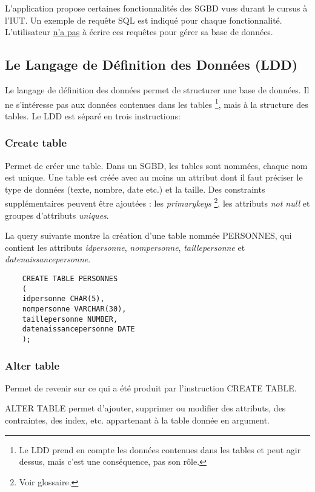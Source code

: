 L'application propose certaines fonctionnalités des SGBD vues durant le cursus à l'IUT.
Un exemple de requête SQL est indiqué pour chaque fonctionnalité.
L'utilisateur \underline{n'a pas} à écrire ces requêtes pour gérer sa base de données.

\subsection{Le Langage de Définition des Données (LDD)}
Le langage de définition des données permet de structurer une base de données.
Il ne s'intéresse pas aux données contenues dans les tables
\footnote{\label{interet_ldd}Le LDD prend en compte les données contenues dans les tables et peut agir dessus, mais c'est une conséquence, pas son rôle.}, mais à la structure des tables. Le LDD est séparé en trois instructions:

\subsubsection{Create table}
Permet de créer une \gls{table}. Dans un SGBD, les tables sont nommées, chaque nom est unique.
Une table est créée avec au moins un attribut dont il faut préciser le type de données (texte, nombre, date etc.) et la taille.
Des \glspl{constraint} supplémentaires peuvent être ajoutées : les \textit{\glspl{primarykey}} \footnote{\label{contrainte_clée_primaire}Voir glossaire.}, les attributs \textit{not null} et groupes d'attributs \textit{uniques}.

La \gls{query} suivante montre la création d'une table nommée PERSONNES, qui contient les attributs \textit{idpersonne}, \textit{nompersonne}, \textit{taillepersonne} et \textit{datenaissancepersonne}.

  \begin{lstlisting}
    CREATE TABLE PERSONNES
    (
    idpersonne CHAR(5),
    nompersonne VARCHAR(30),
    taillepersonne NUMBER,
    datenaissancepersonne DATE
    );
  \end{lstlisting}

\subsubsection{Alter table}
Permet de revenir sur ce qui a été produit par l'instruction CREATE TABLE.

ALTER TABLE permet d'ajouter, supprimer ou modifier des \glspl{attribut}, des contraintes, des index, etc. appartenant à la table donnée en argument.


